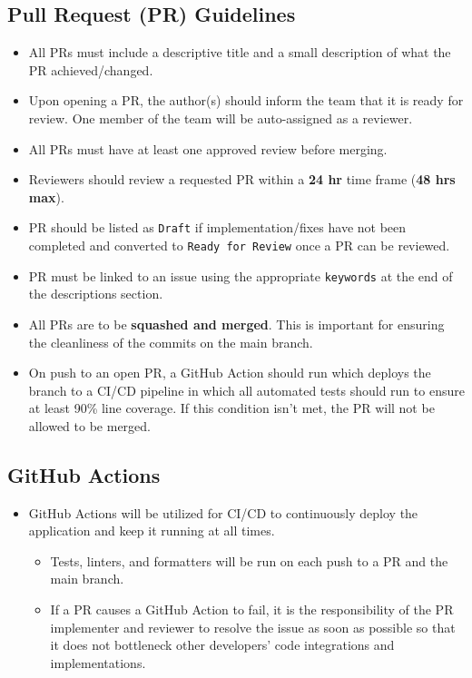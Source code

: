 \documentclass{article}
\begin{document}
\newpage

\subsection{Pull Request (PR) Guidelines}
\begin{itemize}
    \item All PRs must include a descriptive title and a small description of
    what the PR achieved/changed.
    \item Upon opening a PR, the author(s) should inform the team that it is
    ready for review. One member of the team will be auto-assigned as a
    reviewer.
    \item All PRs must have at least one approved review before merging.
\end{itemize}

\begin{itemize}
    \item Reviewers should review a requested PR within a \textbf{24 hr} time
    frame (\textbf{48 hrs max}).
    \item PR should be listed as \texttt{Draft} if implementation/fixes have not
    been completed and converted to \texttt{Ready for Review} once a PR can be
    reviewed.
    \item PR must be linked to an issue using the appropriate \texttt{keywords}
    at the end of the descriptions section.
    \item All PRs are to be \textbf{squashed and merged}. This is important for
    ensuring the cleanliness of the commits on the main branch.
    \item On push to an open PR, a GitHub Action should run which deploys the
    branch to a CI/CD pipeline in which all automated tests should run to ensure
    at least 90\% line coverage. If this condition isn’t met, the PR will not be
    allowed to be merged.
\end{itemize}

\subsection{GitHub Actions}
\begin{itemize}
    \item GitHub Actions will be utilized for CI/CD to continuously deploy the
    application and keep it running at all times.
    \begin{itemize}
        \item Tests, linters, and formatters will be run on each push to a PR
        and the main branch.
        \item If a PR causes a GitHub Action to fail, it is the responsibility
        of the PR implementer and reviewer to resolve the issue as soon as
        possible so that it does not bottleneck other developers’ code
        integrations and implementations.
    \end{itemize}
\end{itemize}
\end{document}
